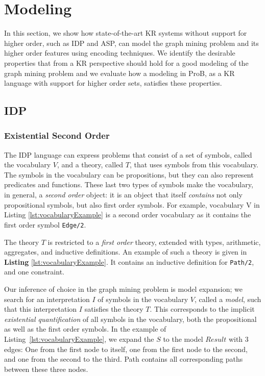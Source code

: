 \section{Modeling}\label{sec:modeling}
In this section, we show how state-of-the-art KR systems without support for higher order, such as IDP and ASP, can model the graph mining problem and its higher order features using encoding techniques.
We identify the desirable properties that from a KR perspective should hold for a good modeling of the graph mining problem and we evaluate how a modeling in ProB, as a KR language with support for higher order sets, satisfies these properties.

\subsection{IDP}
\subsubsection{Existential Second Order}
The IDP language can express problems that consist of a set of symbols, called the vocabulary $V$, and a theory, called $T$, that uses symbols from this vocabulary.
The symbols in the vocabulary can be propositions, but they can also represent predicates and functions.
These last two types of symbols make the vocabulary, in general, a \emph{second order} object: it is an object that itself \emph{contains} not only propositional symbols, but also first order symbols.
For example, vocabulary V in Listing \ref{lst:vocabularyExample} is a second order vocabulary as it contains the first order symbol \lstinline{Edge/2}.

The theory $T$ is restricted to a \emph{first order} theory, extended with types, arithmetic, aggregates, and inductive definitions.
An example of such a theory is given in \textbf{Listing} \ref{lst:vocabularyExample}.
It contains an inductive definition for \lstinline{Path/2}, and one constraint.

Our inference of choice in the graph mining problem is model expansion; we search for an interpretation $I$ of symbols in the vocabulary $V$, called a \emph{model}, such that this interpretation $I$ satisfies the theory $T$.
This corresponds to the implicit \emph{existential quantification} of all symbols in the vocabulary, both the propositional as well as the first order symbols.
In the example of Listing~\ref{lst:vocabularyExample}, we expand the $S$ to the model $Result$ with 3 edges: One from the first node to itself, one from the first node to the second, and one from the second to the third.
Path contains all corresponding paths between these three nodes.

